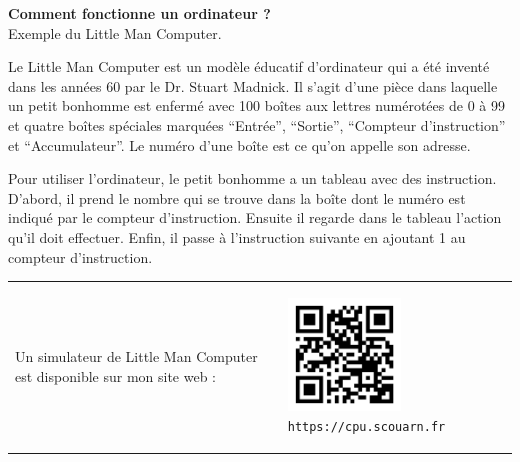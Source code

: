 \documentclass[12pt]{article}
\begin{document}
\sffamily

\begin{center}
    \LARGE\textbf{Comment fonctionne un ordinateur ?} \\
    \large Exemple du Little Man Computer. \\
\end{center}

\normalsize
Le Little Man Computer est un modèle éducatif d'ordinateur qui a été inventé dans les années 60 par le Dr. Stuart Madnick.
Il s'agit d'une pièce dans laquelle un petit bonhomme est enfermé avec 100 boîtes aux lettres
numérotées de 0 à 99 et quatre boîtes spéciales marquées \enquote{Entrée}, \enquote{Sortie}, \enquote{Compteur d'instruction} et \enquote{Accumulateur}.
Le numéro d'une boîte est ce qu'on appelle son adresse.
\par
Pour utiliser l'ordinateur, le petit bonhomme a un tableau avec des instruction.
D'abord, il prend le nombre qui se trouve dans la boîte dont le numéro est indiqué par le compteur d'instruction.
Ensuite il regarde dans le tableau l'action qu'il doit effectuer.
Enfin, il passe à l'instruction suivante en ajoutant 1 au compteur d'instruction.

\begin{center}
\begin{tabular}{m{7cm} m{5cm}}
    Un simulateur de Little Man Computer est disponible sur mon site web :
& 
    \begin{center}
    \includegraphics[width=3.0cm]{figures/qrcode.png}
    \texttt{https://cpu.scouarn.fr}
    \end{center}
\end{tabular}
\end{center}
\end{document}
